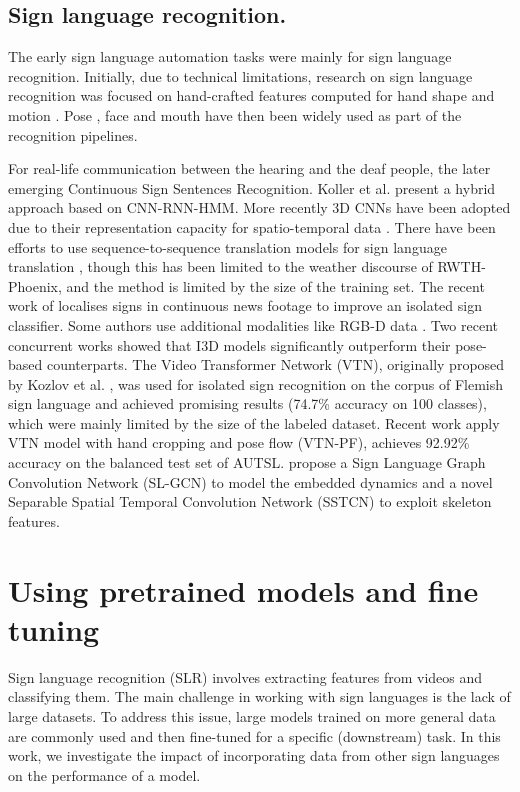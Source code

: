 \documentclass[]{spie}
\begin{document}
\subsection{Sign language recognition.}

The early sign language automation tasks were mainly for sign language recognition. Initially, due to technical limitations, research on sign language recognition was focused on hand-crafted features computed for hand shape and motion \cite{Farhadi2007, Tamura1988, Fillbrandt2003}. Pose \cite{Buehler2009, Camgoz2017, Cooper2011, Ong2012, Pfister2014}, face \cite{Farhadi2007, Koller2015, Nguyen2008} and mouth \cite{Antonakos2015, KollerNey2014,Koller2015} have then been widely used as part of the recognition pipelines. 


For real-life communication between the hearing and the deaf people, the later emerging Continuous Sign Sentences Recognition. Koller et al. \cite{Koller2017} present a hybrid approach based on CNN-RNN-HMM. More recently 3D CNNs have been adopted due to their representation capacity for spatio-temporal data \cite{Bilge2019, Camgoz2016, Huang2015, Albanie2020, Li2020}.  There have been efforts to use sequence-to-sequence translation models for sign language translation \cite{Camgoz2018}, though this has been limited to the weather discourse of RWTH-Phoenix, and the method is limited by the size of the training set. The recent work of \cite{LiYu2020} localises signs in continuous news footage to improve an isolated sign classifier. Some authors use additional modalities like RGB-D data \cite{Sincan2020}. Two recent concurrent works \cite{Albanie2020,Li2020} showed that I3D models  significantly outperform their pose-based counterparts. 
The Video Transformer Network (VTN), originally proposed by Kozlov et al. \cite{kozlov2020lightweight}, was used for isolated sign recognition on the corpus of Flemish sign language and achieved promising results (74.7\% accuracy on 100 classes), which were mainly limited by the size of the labeled dataset. Recent work \cite{DeCoster2021} apply VTN model  with hand cropping and pose flow (VTN-PF), achieves 92.92\% accuracy on the balanced test set of AUTSL.
\cite{Jiang2021} propose a Sign Language Graph Convolution Network (SL-GCN) to model the embedded dynamics and a novel Separable Spatial Temporal Convolution Network (SSTCN) to exploit skeleton features.




\section{Using pretrained models and fine tuning}
Sign language recognition (SLR) involves extracting features from videos and classifying them. The main challenge in working with sign languages is the lack of large datasets. To address this issue, large models trained on more general data are commonly used and then fine-tuned for a specific (downstream) task. In this work, we investigate the impact of incorporating data from other sign languages on the performance of a model. 
\end{document}
